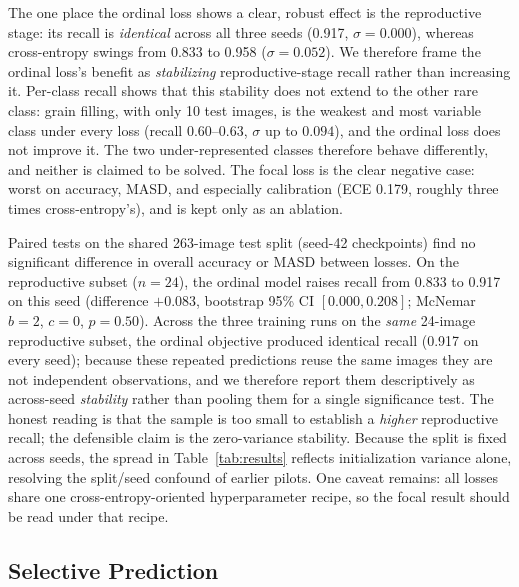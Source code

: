 \documentclass[conference]{IEEEtran}
\begin{document}


The one place the ordinal loss shows a clear, robust effect is the reproductive stage: its recall is \emph{identical} across all three seeds (0.917, $\sigma=0.000$), whereas cross-entropy swings from 0.833 to 0.958 ($\sigma=0.052$). We therefore frame the ordinal loss's benefit as \emph{stabilizing} reproductive-stage recall rather than increasing it. Per-class recall  shows that this stability does not extend to the other rare class: grain filling, with only 10 test images, is the weakest and most variable class under every loss (recall $0.60$--$0.63$, $\sigma$ up to $0.094$), and the ordinal loss does not improve it. The two under-represented classes therefore behave differently, and neither is claimed to be solved. The focal loss is the clear negative case: worst on accuracy, MASD, and especially calibration (ECE 0.179, roughly three times cross-entropy's), and is kept only as an ablation.

Paired tests on the shared 263-image test split (seed-42 checkpoints) find no significant difference in overall accuracy or MASD between losses. On the reproductive subset ($n=24$), the ordinal model raises recall from 0.833 to 0.917 on this seed (difference $+0.083$, bootstrap 95\% CI $[0.000,0.208]$; McNemar $b{=}2$, $c{=}0$, $p{=}0.50$). Across the three training runs on the \emph{same} 24-image reproductive subset, the ordinal objective produced identical recall (0.917 on every seed); because these repeated predictions reuse the same images they are not independent observations, and we therefore report them descriptively as across-seed \emph{stability} rather than pooling them for a single significance test. The honest reading is that the sample is too small to establish a \emph{higher} reproductive recall; the defensible claim is the zero-variance stability. Because the split is fixed across seeds, the spread in Table~\ref{tab:results} reflects initialization variance alone, resolving the split/seed confound of earlier pilots. One caveat remains: all losses share one cross-entropy-oriented hyperparameter recipe, so the focal result should be read under that recipe.




\subsection{Selective Prediction}
\end{document}
